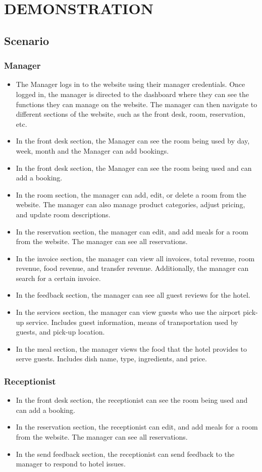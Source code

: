 \chapter{DEMONSTRATION}
    \section{Scenario}
    \subsection{Manager}
    \begin{itemize}
        \item The Manager logs in to the website using their manager credentials. Once logged in, the manager is directed to the dashboard where they can see the functions they can manage on the website. The manager can then navigate to different sections of the website, such as the front desk, room, reservation, etc.
        \item In the front desk section, the Manager can see the room being used by day, week, month and the Manager can add bookings.
        \item In the front desk section, the Manager can see the room being used and can add a booking.
        \item In the room section, the manager can add, edit, or delete a room from the website. The manager can also manage product categories, adjust pricing, and update room descriptions.
        \item In the reservation section, the manager can edit, and add meals for a room from the website. The manager can see all reservations.
        \item In the invoice section, the manager can view all invoices, total revenue, room revenue, food revenue, and transfer revenue. Additionally, the manager can search for a certain invoice.
        \item In the feedback section, the manager can see all guest reviews for the hotel.
        \item In the services section, the manager can view guests who use the airport pick-up service. Includes guest information, means of transportation used by guests, and pick-up location.
        \item In the meal section, the manager views the food that the hotel provides to serve guests. Includes dish name, type, ingredients, and price.
    \end{itemize}
    \subsection{Receptionist}
    \begin{itemize}
        \item In the front desk section, the receptionist can see the room being used and can add a booking.
        \item In the reservation section, the receptionist can edit, and add meals for a room from the website. The manager can see all reservations.
        \item In the send feedback section, the receptionist can send feedback to the manager to respond to hotel issues.
    \end{itemize}
